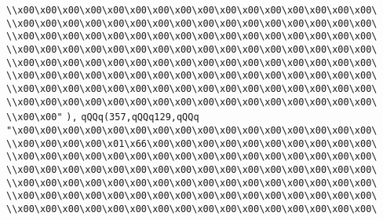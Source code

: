 \verb|\\x00\x00\x00\x00\x00\x00\x00\x00\x00\x00\x00\x00\x00\x00\x00\x00\|\newline
\verb|\\x00\x00\x00\x00\x00\x00\x00\x00\x00\x00\x00\x00\x00\x00\x00\x00\|\newline
\verb|\\x00\x00\x00\x00\x00\x00\x00\x00\x00\x00\x00\x00\x00\x00\x00\x00\|\newline
\verb|\\x00\x00\x00\x00\x00\x00\x00\x00\x00\x00\x00\x00\x00\x00\x00\x00\|\newline
\verb|\\x00\x00\x00\x00\x00\x00\x00\x00\x00\x00\x00\x00\x00\x00\x00\x00\|\newline
\verb|\\x00\x00\x00\x00\x00\x00\x00\x00\x00\x00\x00\x00\x00\x00\x00\x00\|\newline
\verb|\\x00\x00\x00\x00\x00\x00\x00\x00\x00\x00\x00\x00\x00\x00\x00\x00\|\newline
\verb|\\x00\x00\x00\x00\x00\x00\x00\x00\x00\x00\x00\x00\x00\x00\x00\x00\|\newline
\verb|\\x00\x00"|\newline
\verb|),|\newline
\verb|qQQq(357,qQQq129,qQQq|\newline
\verb|"\x00\x00\x00\x00\x00\x00\x00\x00\x00\x00\x00\x00\x00\x00\x00\x00\|\newline
\verb|\\x00\x00\x00\x00\x01\x66\x00\x00\x00\x00\x00\x00\x00\x00\x00\x00\|\newline
\verb|\\x00\x00\x00\x00\x00\x00\x00\x00\x00\x00\x00\x00\x00\x00\x00\x00\|\newline
\verb|\\x00\x00\x00\x00\x00\x00\x00\x00\x00\x00\x00\x00\x00\x00\x00\x00\|\newline
\verb|\\x00\x00\x00\x00\x00\x00\x00\x00\x00\x00\x00\x00\x00\x00\x00\x00\|\newline
\verb|\\x00\x00\x00\x00\x00\x00\x00\x00\x00\x00\x00\x00\x00\x00\x00\x00\|\newline
\verb|\\x00\x00\x00\x00\x00\x00\x00\x00\x00\x00\x00\x00\x00\x00\x00\x00\|\newline

